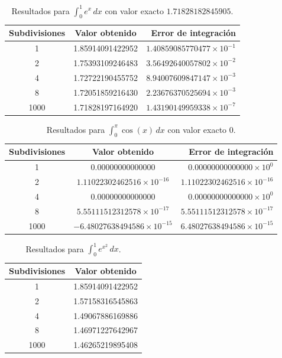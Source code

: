\documentclass[12pt, a4paper]{article}
\theoremstyle{rioplatense}
\begin{document}
\begin{table}[h]
\centering
\caption{Resultados para \(\int_0^1 e^x \, dx\) con valor exacto \(1.71828182845905\).}
\begin{tabular}{ccr}
\toprule
\textbf{Subdivisiones} & \textbf{Valor obtenido} & \textbf{Error de integración} \\
\midrule
1 & 1.85914091422952 & \(1.40859085770477 \times 10^{-1}\) \\
2 & 1.75393109246483 & \(3.56492640057802 \times 10^{-2}\) \\
4 & 1.72722190455752 & \(8.94007609847147 \times 10^{-3}\) \\
8 & 1.72051859216430 & \(2.23676370525694 \times 10^{-3}\) \\
1000 & 1.71828197164920 & \(1.43190149959338 \times 10^{-7}\) \\
\bottomrule
\end{tabular}
\end{table}

\begin{table}[h]
\centering
\caption{Resultados para \(\int_0^\pi \cos(x) \, dx\) con valor exacto \(0\).}
\begin{tabular}{ccr}
\toprule
\textbf{Subdivisiones} & \textbf{Valor obtenido} & \textbf{Error de integración} \\
\midrule
1 & 0.00000000000000 & \(0.00000000000000 \times 10^0\) \\
2 & \(1.11022302462516 \times 10^{-16}\) & \(1.11022302462516 \times 10^{-16}\) \\
4 & 0.00000000000000 & \(0.00000000000000 \times 10^0\) \\
8 & \(5.55111512312578 \times 10^{-17}\) & \(5.55111512312578 \times 10^{-17}\) \\
1000 & \(-6.48027638494586 \times 10^{-15}\) & \(6.48027638494586 \times 10^{-15}\) \\
\bottomrule
\end{tabular}
\end{table}

\begin{table}[h]
\centering
\caption{Resultados para \(\int_0^1 e^{x^2} \, dx\).}
\begin{tabular}{cc}
\toprule
\textbf{Subdivisiones} & \textbf{Valor obtenido} \\
\midrule
1 & 1.85914091422952 \\
2 & 1.57158316545863 \\
4 & 1.49067886169886 \\
8 & 1.46971227642967 \\
1000 & 1.46265219895408 \\
\bottomrule
\end{tabular}
\end{table}
\end{document}
